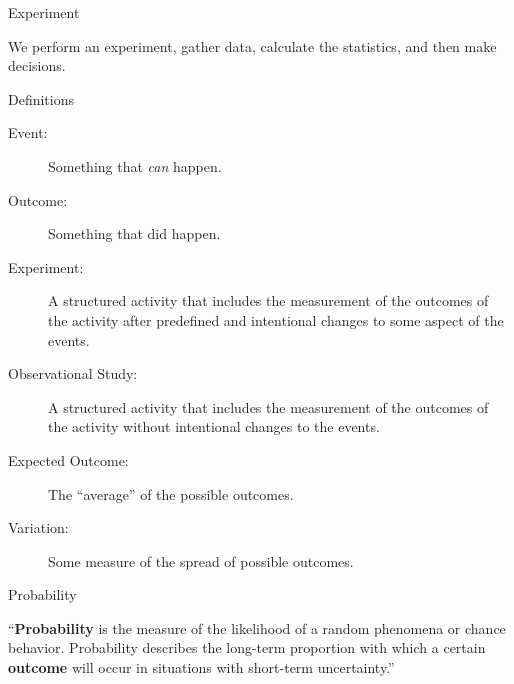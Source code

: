 \begin{frame}{Experiment}

  We perform an experiment, gather data, calculate the statistics, and
  then make decisions. 

  \vfill


  \vfill
  
\end{frame}



\begin{frame}{Definitions}

  \begin{description}
  \item[Event:] Something that \textit{can} happen.
  \item[Outcome:] Something that did happen.
  \item[Experiment:] A structured activity that includes the
    measurement of the outcomes of the activity after predefined and
    intentional changes to some aspect of the events.
  \item[Observational Study:] A structured activity that includes the
    measurement of the outcomes of the activity without intentional
    changes to the events.
  \item[Expected Outcome:] The ``average'' of the possible outcomes.
  \item[Variation:] Some measure of the spread of possible outcomes.
  \end{description}
  
\end{frame}


\begin{frame}{Probability}

  \begin{definition}[Probability]
    ``\textbf{Probability} is the measure of the likelihood of a random
    phenomena or chance behavior. Probability describes the long-term
    proportion with which a certain \textbf{outcome} will occur in
    situations with short-term uncertainty.'' %
  \end{definition}

  
\end{frame}



